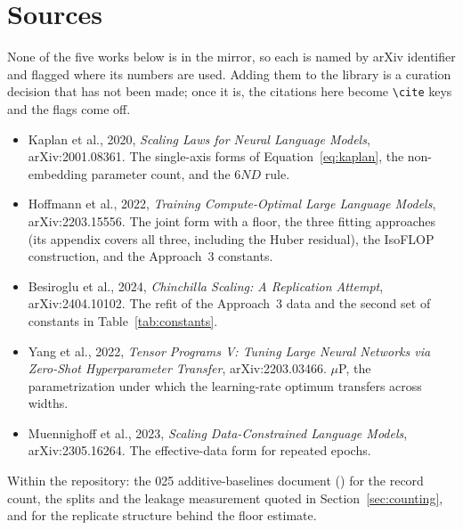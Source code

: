 
\section{Sources}
\label{sec:sources}

None of the five works below is in the mirror, so each is named by arXiv
identifier and flagged where its numbers are used. Adding them to the library is
a curation decision that has not been made; once it is, the citations here become
\texttt{\textbackslash cite} keys and the flags come off.

\begin{itemize}
\item Kaplan et al., 2020, \emph{Scaling Laws for Neural Language Models},
arXiv:2001.08361. The single-axis forms of Equation~\ref{eq:kaplan}, the
non-embedding parameter count, and the $6ND$ rule.
\item Hoffmann et al., 2022, \emph{Training Compute-Optimal Large Language
Models}, arXiv:2203.15556. The joint form with a floor, the three fitting
approaches (its appendix covers all three, including the Huber residual), the
IsoFLOP construction, and the Approach~3 constants.
\item Besiroglu et al., 2024, \emph{Chinchilla Scaling: A Replication Attempt},
arXiv:2404.10102. The refit of the Approach~3 data and the second set of
constants in Table~\ref{tab:constants}.
\item Yang et al., 2022, \emph{Tensor Programs V: Tuning Large Neural Networks
via Zero-Shot Hyperparameter Transfer}, arXiv:2203.03466. $\mu$P, the
parametrization under which the learning-rate optimum transfers across widths.
\item Muennighoff et al., 2023, \emph{Scaling Data-Constrained Language Models},
arXiv:2305.16264. The effective-data form for repeated epochs.
\end{itemize}

Within the repository: the 025 additive-baselines document
() for the record count, the
splits and the leakage measurement quoted in Section~\ref{sec:counting}, and
 for
the replicate structure behind the floor estimate.

